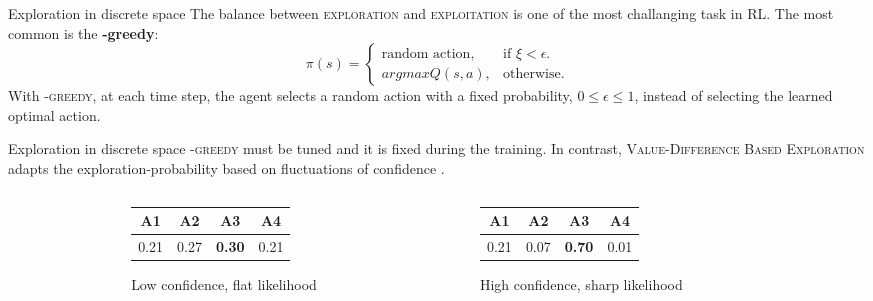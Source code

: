 \documentclass[10pt]{beamer}
\begin{document}
\begin{frame}{Exploration in discrete space}
	The balance between \textsc{exploration} and \textsc{exploitation} is one of the most challanging task in \textsc{RL}.
	The most common is the \textbf{\textepsilon-greedy}:
	\begin{equation}
  \pi(s)=\begin{cases}
    \text{random action}, & \text{if $\xi < \epsilon$}.\\
    argmax Q(s, a), & \text{otherwise}.
  \end{cases}
\end{equation}
	With \textsc{\textepsilon-greedy}, at each time step, the agent selects a random action with a fixed probability, $0 \leq \epsilon \leq 1$, instead of selecting the learned optimal action.
\end{frame}

\begin{frame}{Exploration in discrete space}
	\textsc{\textepsilon-greedy} must be tuned and it is fixed during the training. In contrast, \textsc{Value-Difference Based Exploration} adapts the exploration-probability based on fluctuations of confidence
	\cite{tokic2011value}.
	\begin{columns}
		\begin{column}{0.1\textwidth}\end{column}
		\begin{column}{0.4\textwidth}
	\begin{figure}
		\begin{tabular}{ |c|c|c|c| } 
		 \hline
			\textbf{A1} & \textbf{A2} & \textbf{A3} & \textbf{A4}  \\ [0.5ex] 
		 \hline
		 \hline
			 0.21 & 0.27 & \textbf{0.30} & 0.21 \\ 
		 \hline
		\end{tabular}
		\caption{Low confidence, flat likelihood}
	\end{figure}

		\end{column}
		\begin{column}{0.4\textwidth}
	\begin{figure}
		\begin{tabular}{ |c|c|c|c| } 
		 \hline
			\textbf{A1} & \textbf{A2} & \textbf{A3} & \textbf{A4}  \\ [0.5ex] 
		 \hline
		 \hline
			 0.21 & 0.07 & \textbf{0.70} & 0.01 \\ 
		 \hline
		\end{tabular}
		\caption{High confidence, sharp likelihood}
	\end{figure}

		\end{column}
		\begin{column}{0.1\textwidth}\end{column}
	\end{columns}
\end{frame}
\end{document}
